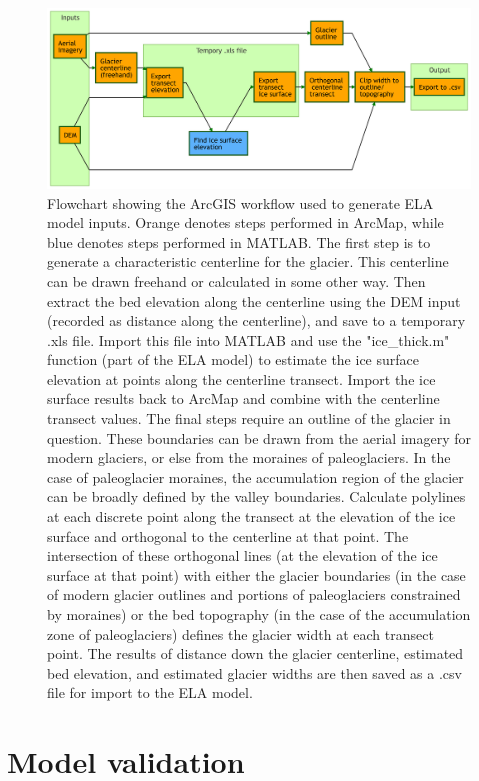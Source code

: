 \documentclass[review]{elsarticle}
\begin{document}
\begin{figure}
    \centering
    \includegraphics[width=\textwidth]{Figures/arc-flow.png}
    \caption{Flowchart showing the ArcGIS workflow used to generate ELA model inputs. Orange denotes steps performed in ArcMap, while blue denotes steps performed in MATLAB. The first step is to generate a characteristic centerline for the glacier. This centerline can be drawn freehand or calculated in some other way. Then extract the bed elevation along the centerline using the DEM input (recorded as distance along the centerline), and save to a temporary .xls file. Import this file into MATLAB and use the "ice\_thick.m" function (part of the ELA model) to estimate the ice surface elevation at points along the centerline transect. Import the ice surface results back to ArcMap and combine with the centerline transect values. The final steps require an outline of the glacier in question. These boundaries can be drawn from the aerial imagery for modern glaciers, or else from the moraines of paleoglaciers. In the case of paleoglacier moraines, the accumulation region of the glacier can be broadly defined by the valley boundaries. Calculate polylines at each discrete point along the transect at the elevation of the ice surface and orthogonal to the centerline at that point. The intersection of these orthogonal lines (at the elevation of the ice surface at that point) with either the glacier boundaries (in the case of modern glacier outlines and portions of paleoglaciers constrained by moraines) or the bed topography (in the case of the accumulation zone of paleoglaciers) defines the glacier width at each transect point. The results of distance down the glacier centerline, estimated bed elevation, and estimated glacier widths are then saved as a .csv file for import to the ELA model.}
    \label{fig:arc-flow}
\end{figure}

\section{Model validation}
\end{document}
